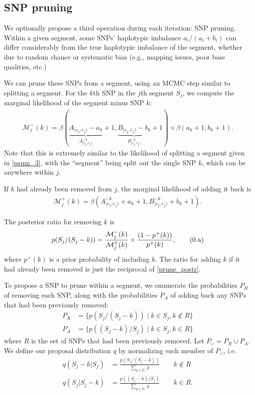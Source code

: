 \documentclass[10pt,letter]{article}
\numberwithin{equation}{section}
\newcommand{\rt}{\right}
\newcommand{\lt}{\left}
\newcommand{\btag}[1]{\addtocounter{equation}{1}\label{#1}\tag{\arabic{section}.\alph{equation}}}
\begin{document}
\subsection{SNP pruning}

We optionally propose a third operation during each iteration: SNP pruning. Within a given segment, some SNPs' haplotypic imbalance $a_i/(a_i+b_i)$ can differ considerably from the true haplotypic imbalance of the segment, whether due to random chance or systematic bias (e.g., mapping issues, poor base qualities, etc.)

We can prune these SNPs from a segment, using an MCMC step similar to splitting a segment. For the $k$th SNP in the $j$th segment $S_j$, we compute the marginal likelihood of the segment minus SNP $k$:
\begin{align*}
\mathcal{M}^{-}_j(k) = \beta(\underbrace{A_{[s_j,e_j)} - a_k}_{A^{-k}_{[s_j,e_j)}} + 1, \underbrace{B_{[s_j,e_j)} - b_k}_{B^{-k}_{[s_j,e_j)}} + 1)\times\beta(a_k + 1, b_k + 1).
\end{align*}
Note that this is extremely similar to the likelihood of splitting a segment given in \eqref{psum_3}, with the ``segment'' being split out the single SNP $k$, which can be anywhere within $j$.

If $k$ had already been removed from $j$, the marginal likelihood of adding it back is
\begin{align*}
\mathcal{M}^{+}_j(k) = \beta(A^{-k}_{[s_j,e_j)} + a_k + 1, B^{-k}_{[s_j,e_j)} + b_k + 1).
\end{align*}

The posterior ratio for removing $k$ is
\begin{align*}
p(S_j/(S_j-k))=\frac{\mathcal{M}^{-}_j(k)}{\mathcal{M}^{+}_j(k)}\times\frac{(1 - p^{+}(k))}{p^{+}(k)},\btag{prune_postr}
\end{align*}
where $p^{+}(k)$ is a prior probability of including $k$. %
The ratio for adding $k$ if it had already been removed is just the reciprocal of \eqref{prune_postr}.

To propose a SNP to prune within a segment, we enumerate the probabilities $P_R$ of removing each SNP, along with the probabilities $P_A$ of adding back any SNPs that had been previously removed:
\begin{align*}
P_R &= \{p(S_j/(S_j - k))\mid k\in S_j, k\notin R\}\\
P_A &= \{p((S_j - k)/S_j)\mid k\in S_j, k\in R\}
\end{align*}
where $R$ is the set of SNPs that had been previously removed. Let $P_{\cup}=P_R\cup P_A$. We define our proposal distribution $q$ by normalizing each member of $P_\cup$, i.e.
\begin{align*}
q(S_j-k|S_j) &= \frac{p(S_j/(S_j-k))}{\sum_{p\in P_\cup} p}\qquad k\notin R\\
q(S_j|S_j-k) &= \frac{p((S_j-k)/S_j)}{\sum_{p\in P_\cup} p}\qquad k\in R.
\end{align*}
\end{document}
